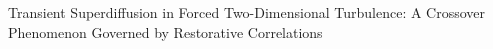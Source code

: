 \documentclass[]{article}
\begin{document}
Transient Superdiffusion in Forced Two-Dimensional Turbulence: A Crossover Phenomenon Governed by Restorative Correlations
\end{document}
